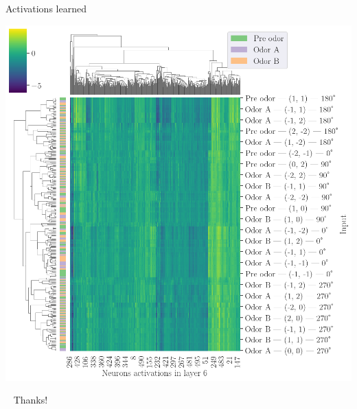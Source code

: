\documentclass[bigger]{beamer}
\begin{document}
\begin{frame}[label={sec:org175f551}]{Activations learned}
\begin{center}
\includegraphics[height=0.9\textheight]{img/activations-learned.png}
\end{center}
\end{frame}
\begin{frame}[label={sec:org5099ea1},standout]{~}
Thanks!
\end{frame}
\end{document}
